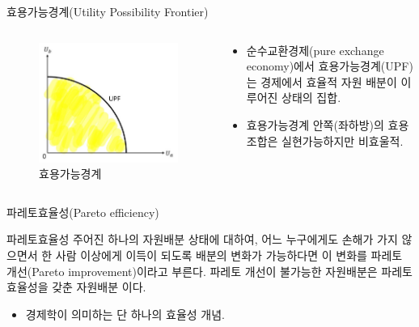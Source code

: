 \documentclass[aspectratio=169,xcolor=dvipsnames,handout]{beamer}
\begin{document}
\begin{frame}{효용가능경계(Utility Possibility Frontier)}
    \begin{columns}
        \begin{column}{.5\textwidth}
            \begin{figure}
                \centering
                \includegraphics[scale=.3]{pic/UPF.jpg}
                \caption{효용가능경계}
            \end{figure}
        \end{column}    
        \begin{column}{.5\textwidth}
            \begin{itemize}
            \item 순수교환경제(pure exchange economy)에서 효용가능경계(UPF)는 경제에서 효율적 자원 배분이 이루어진 상태의 집합.
            \item 효용가능경계 안쪽(좌하방)의 효용조합은 실현가능하지만 비효울적.
            \end{itemize}
        \end{column}    
    \end{columns}
\end{frame}

\begin{frame}{파레토효율성(Pareto efficiency)}
    \begin{alertblock}{파레토효율성}
        주어진 하나의 자원배분 상태에 대하여, 어느 누구에게도 손해가 가지 않으면서 한 사람 이상에게 이득이 되도록 배분의 변화가 가능하다면 이 변화를 파레토 개선(Pareto improvement)이라고 부른다. 파레토 개선이 불가능한 자원배분은 파레토 효율성을 갖춘 자원배분 이다.
    \end{alertblock}
    \begin{itemize}
        \item 경제학이 의미하는 단 하나의 효율성 개념.
    \end{itemize}
\end{frame}
\end{document}
